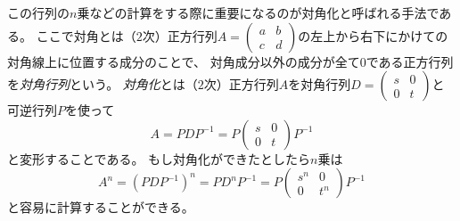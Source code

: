 この行列の$n$乗などの計算をする際に重要になるのが対角化と呼ばれる手法である。
ここで対角とは（$2$次）正方行列$A = \begin{pmatrix}a & b \\ c & d\end{pmatrix}$の左上から右下にかけての対角線上に位置する成分のことで、
対角成分以外の成分が全て$0$である正方行列を\emph{対角行列}という。
\emph{対角化}とは（$2$次）正方行列$A$を対角行列$D = \begin{pmatrix}s & 0 \\ 0 & t\end{pmatrix}$と可逆行列$P$を使って
$$
A = P D P^{-1} = P\begin{pmatrix}s & 0 \\ 0 & t\end{pmatrix}P^{-1}
$$
と変形することである。
もし対角化ができたとしたら$n$乗は
$$
A^n = (P D P^{-1})^n = P D^n P^{-1} = P\begin{pmatrix}s^n & 0 \\ 0 & t^n\end{pmatrix}P^{-1}
$$
と容易に計算することができる。


